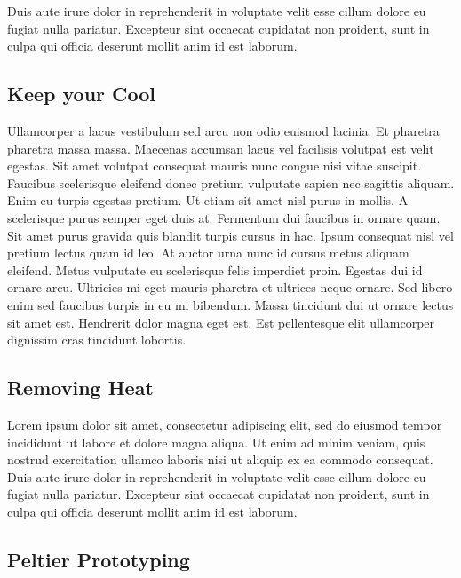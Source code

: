 \documentclass[]{book}
\begin{document}
Duis aute irure dolor in reprehenderit in voluptate velit esse cillum
dolore eu fugiat nulla pariatur. Excepteur sint occaecat cupidatat non
proident, sunt in culpa qui officia deserunt mollit anim id est laborum.

\subsection*{Keep your Cool}\label{keep-your-cool}

Ullamcorper a lacus vestibulum sed arcu non odio euismod lacinia. Et
pharetra pharetra massa massa. Maecenas accumsan lacus vel facilisis
volutpat est velit egestas. Sit amet volutpat consequat mauris nunc
congue nisi vitae suscipit. Faucibus scelerisque eleifend donec pretium
vulputate sapien nec sagittis aliquam. Enim eu turpis egestas pretium.
Ut etiam sit amet nisl purus in mollis. A scelerisque purus semper eget
duis at. Fermentum dui faucibus in ornare quam. Sit amet purus gravida
quis blandit turpis cursus in hac. Ipsum consequat nisl vel pretium
lectus quam id leo. At auctor urna nunc id cursus metus aliquam
eleifend. Metus vulputate eu scelerisque felis imperdiet proin. Egestas
dui id ornare arcu. Ultricies mi eget mauris pharetra et ultrices neque
ornare. Sed libero enim sed faucibus turpis in eu mi bibendum. Massa
tincidunt dui ut ornare lectus sit amet est. Hendrerit dolor magna eget
est. Est pellentesque elit ullamcorper dignissim cras tincidunt
lobortis.

\subsection*{Removing Heat}\label{removing-heat}

Lorem ipsum dolor sit amet, consectetur adipiscing elit, sed do eiusmod
tempor incididunt ut labore et dolore magna aliqua. Ut enim ad minim
veniam, quis nostrud exercitation ullamco laboris nisi ut aliquip ex ea
commodo consequat. Duis aute irure dolor in reprehenderit in voluptate
velit esse cillum dolore eu fugiat nulla pariatur. Excepteur sint
occaecat cupidatat non proident, sunt in culpa qui officia deserunt
mollit anim id est laborum.

\subsection*{Peltier Prototyping}\label{peltier-prototyping}
\end{document}
